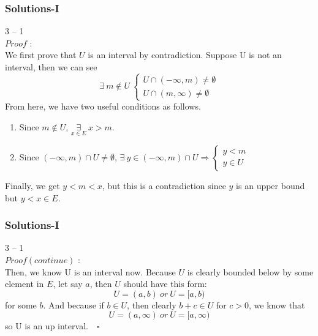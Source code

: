 \documentclass[12pt, t]{beamer}
\begin{document}
\begin{frame}
    \frametitle{Solutions-I}
3 -- 1\\
$Proof$ : \\
\hspace{1em} We first prove that $U$ is an interval by contradiction. Suppose U is not an interval, then we can see 
\begin{equation*}
    \exists\ m\notin U\ 
    \begin{cases}
        U\cap(-\infty, m)\neq \emptyset\\
        U\cap(m,\infty)\neq \emptyset
    \end{cases}
\end{equation*}
\hspace{1em} From here, we have two useful conditions as follows.
    \begin{enumerate}
        \item Since $m\notin U$, $\underset{x\in E}{\exists}\ x>m $.
        \item Since $(-\infty,m)\cap U\neq \emptyset$, $\exists\ y\in (-\infty,m)\cap U\Rightarrow 
        \begin{cases}
          y<m\\
          y\in U  
        \end{cases}$
    \end{enumerate}
\hspace{1em} Finally, we get $y<m<x$, but this is a contradiction since $y$ is an upper bound but $y<x\in E$.
\end{frame}

\begin{frame}
    \frametitle{Solutions-I}
3 -- 1\\
$Proof(continue)$ : \\
\hspace{1em} Then, we know U is an interval now. Because $U$ is clearly bounded below by some element in $E$, let say $a$, then 
$U$ should have this form:
\begin{equation*}
    U=(a,b)\ or\ U=[a,b)
\end{equation*}
for some $b$. And because if $b\in U$, then clearly $b+c\in U$ for $c>0$, we know that 
\begin{equation*}
    U=(a,\infty)\ or\ U=[a,\infty)
\end{equation*}
so U is an up interval.$\quad \square$

\end{frame}
\end{document}

